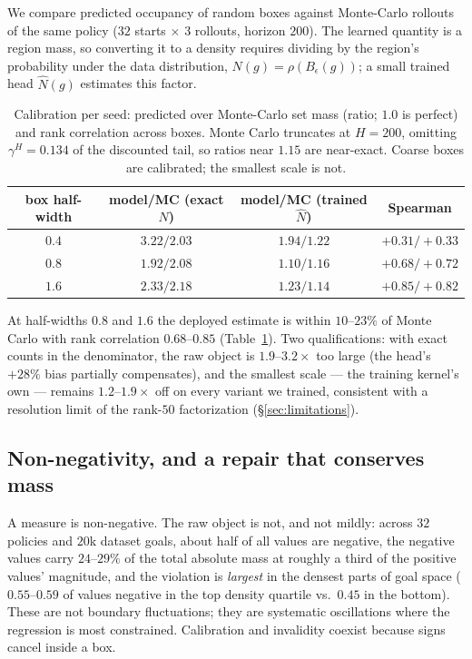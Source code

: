 \documentclass{article}
\newcommand{\Nhat}{\hat N}
\begin{document}
We compare predicted occupancy of random boxes against Monte-Carlo rollouts of
the same policy ($32$ starts $\times$ $3$ rollouts, horizon $200$). The learned
quantity is a region mass, so converting it to a density requires dividing by
the region's probability under the data distribution,
$N(g)=\rho(B_\epsilon(g))$; a small trained head $\Nhat(g)$ estimates this
factor.

\begin{table}[t]
\centering\small
\begin{tabular}{c c c c}
\toprule
box half-width & model/MC (exact $N$) & model/MC (trained $\Nhat$) & Spearman \\
\midrule
$0.4$ & $3.22/2.03$ & $1.94/1.22$ & $+0.31/+0.33$ \\
$0.8$ & $1.92/2.08$ & $\mathbf{1.10/1.16}$ & $+0.68/+0.72$ \\
$1.6$ & $2.33/2.18$ & $\mathbf{1.23/1.14}$ & $+0.85/+0.82$ \\
\bottomrule
\end{tabular}
\caption{Calibration per seed: predicted over Monte-Carlo set mass (ratio;
$1.0$ is perfect) and rank correlation across boxes. Monte Carlo truncates at
$H{=}200$, omitting $\gamma^{H}=0.134$ of the discounted tail, so ratios near
$1.15$ are near-exact. Coarse boxes are calibrated; the smallest scale is not.}
\label{tab:calib}
\end{table}

At half-widths $0.8$ and $1.6$ the deployed estimate is within $10$--$23\%$ of
Monte Carlo with rank correlation $0.68$--$0.85$ (Table~\ref{tab:calib}). Two
qualifications: with exact counts in the denominator, the raw object is
$1.9$--$3.2\times$ too large (the head's $+28\%$ bias partially compensates),
and the smallest scale --- the training kernel's own --- remains
$1.2$--$1.9\times$ off on every variant we trained, consistent with a
resolution limit of the rank-$50$ factorization (\S\ref{sec:limitations}).

\subsection{Non-negativity, and a repair that conserves mass}
\label{sec:nonneg}

A measure is non-negative. The raw object is not, and not mildly: across $32$
policies and $20$k dataset goals, about half of all values are negative, the
negative values carry $24$--$29\%$ of the total absolute mass at roughly a
third of the positive values' magnitude, and the violation is \emph{largest} in
the densest parts of goal space ($0.55$--$0.59$ of values negative in the top
density quartile vs.\ $0.45$ in the bottom). These are not boundary
fluctuations; they are systematic oscillations where the regression is most
constrained. Calibration and invalidity coexist because signs cancel inside a
box.
\end{document}
